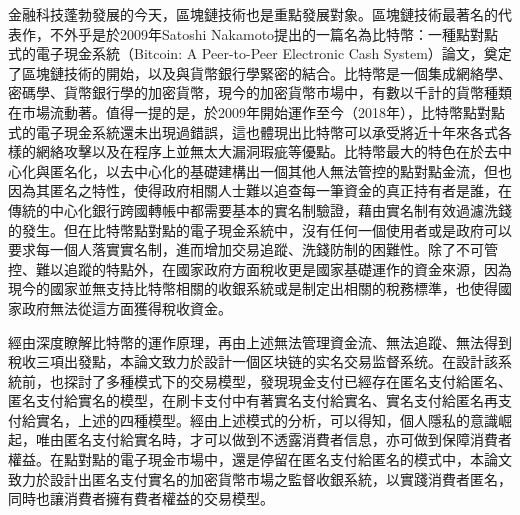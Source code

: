 \begin{cabstract}

	金融科技蓬勃發展的今天，區塊鏈技術也是重點發展對象。區塊鏈技術最著名的代表作，不外乎是於2009年Satoshi Nakamoto提出的一篇名為比特幣：一種點對點式的電子現金系統（Bitcoin: A Peer-to-Peer Electronic Cash System）論文\parencite{bitcoinpaper}，奠定了區塊鏈技術的開始，以及與貨幣銀行學緊密的結合。比特幣是一個集成網絡學、密碼學、貨幣銀行學的加密貨幣，現今的加密貨幣市場中，有數以千計的貨幣種類在市場流動著。值得一提的是，於2009年開始運作至今（2018年），比特幣點對點式的電子現金系統還未出現過錯誤，這也體現出比特幣可以承受將近十年來各式各樣的網絡攻擊以及在程序上並無太⼤漏洞瑕疵等優點。比特幣最大的特色在於去中心化與匿名化，以去中⼼化的基礎建構出⼀個其他人無法管控的點對點⾦流，但也因為其匿名之特性，使得政府相關人⼠難以追查每⼀筆資⾦的真正持有者是誰，在傳統的中心化銀行跨國轉帳中都需要基本的實名制驗證，藉由實名制有效過濾洗錢的發生。但在比特幣點對點的電子現金系統中，沒有任何一個使用者或是政府可以要求每一個人落實實名制，進而增加交易追蹤、洗錢防制的困難性。除了不可管控、難以追蹤的特點外，在國家政府方面稅收更是國家基礎運作的資⾦來源，因為現今的國家並無支持比特幣相關的收銀系統或是制定出相關的稅務標準，也使得國家政府無法從這方面獲得稅收資金。

	經由深度瞭解比特幣的運作原理，再由上述無法管理資金流、無法追蹤、無法得到稅收三項出發點，本論文致力於設計一個区块链的实名交易监督系统。在設計該系統前，也探討了多種模式下的交易模型，發現現金支付已經存在匿名支付給匿名、匿名支付給實名的模型，在刷卡支付中有著實名支付給實名、實名支付給匿名再支付給實名，上述的四種模型。經由上述模式的分析，可以得知，個人隱私的意識崛起，唯由匿名支付給實名時，才可以做到不透露消費者信息，亦可做到保障消費者權益。在點對點的電子現金市場中，還是停留在匿名支付給匿名的模式中，本論⽂致⼒於設計出匿名⽀付實名的加密貨幣市場之監督收銀系統，以實踐消費者匿名，同時也讓消費者擁有費者權益的交易模型。
\end{cabstract}


